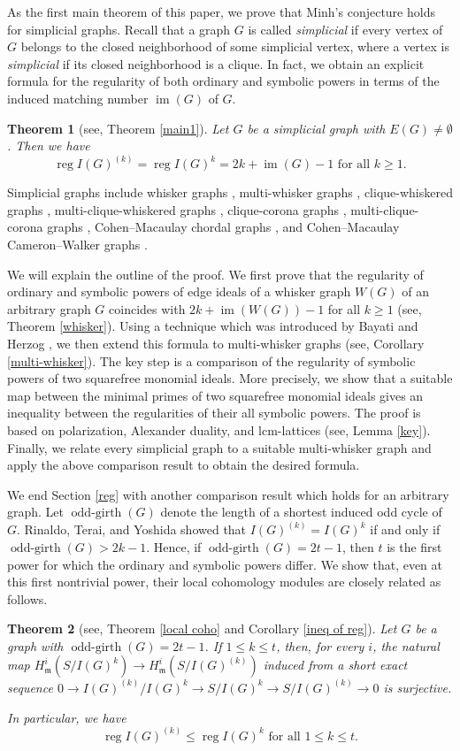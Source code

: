 \documentclass[12pt]{amsart}
\newtheorem{thm}{Theorem}[section]
\theoremstyle{definition}
\theoremstyle{remark}
\DeclareMathOperator{\reg}{reg}
\DeclareMathOperator{\im}{im}
\DeclareMathOperator{\ogirth}{odd-girth}
\begin{document}
As the first main theorem of this paper, we prove that Minh's conjecture holds for simplicial graphs. Recall that a graph $G$ is called {\it simplicial} if every vertex of $G$ belongs to the closed neighborhood of some simplicial vertex, where a vertex is {\it simplicial} if its closed neighborhood is a clique. In fact, we obtain an explicit formula for the regularity of both ordinary and symbolic powers in terms of the induced matching number $\im(G)$ of $G$. 
\begin{thm}[see, Theorem \ref{main1}]
Let $G$ be a simplicial graph with $E(G)\neq\emptyset$. Then we have 
$$\reg I(G)^{(k)}=\reg I(G)^{k}=2k+\im(G)-1\mbox{ for all }k\geq1.$$
\end{thm}
Simplicial graphs include whisker graphs \cite{v1990}, multi-whisker graphs \cite{mpt2025}, clique-whiskered graphs \cite{cn2012}, multi-clique-whiskered graphs \cite{mt2025}, clique-corona graphs \cite{hp2022}, multi-clique-corona graphs \cite{mt2026}, Cohen--Macaulay chordal graphs \cite{hhz2006}, and Cohen--Macaulay Cameron--Walker graphs \cite{hhko2015}.

We will explain the outline of the proof. We first prove that the regularity of ordinary and symbolic powers of edge ideals of a whisker graph $W(G)$ of an arbitrary graph $G$ coincides with $2k+\im(W(G))-1$ for all $k\geq1$ (see, Theorem \ref{whisker}). Using a technique which was introduced by Bayati and Herzog \cite{bh2014}, we then extend this formula to multi-whisker graphs (see, Corollary \ref{multi-whisker}). The key step is a comparison of the regularity of symbolic powers of two squarefree monomial ideals. More precisely, we show that a suitable map between the minimal primes of two squarefree monomial ideals gives an inequality between the regularities of their all symbolic powers. The proof is based on polarization, Alexander duality, and lcm-lattices (see, Lemma \ref{key}). Finally, we relate every simplicial graph to a suitable multi-whisker graph and apply the above comparison result to obtain the desired formula. 

We end Section \ref{reg} with another comparison result which holds for an arbitrary graph. Let $\ogirth(G)$ denote the length of a shortest induced odd cycle of $G$. Rinaldo, Terai, and Yoshida \cite{rty2011} showed that $I(G)^{(k)}=I(G)^{k}$ if and only if $\ogirth(G)>2k-1$. Hence, if $\ogirth(G)=2t-1$, then $t$ is the first power for which the ordinary and symbolic powers differ. We show that, even at this first nontrivial power, their local cohomology modules are closely related as follows. 
\begin{thm}[see, Theorem \ref{local coho} and Corollary \ref{ineq of reg}]
Let $G$ be a graph with $\ogirth(G)=2t-1$. If $1\leq k\leq t$, then, for every $i$, the natural map $H_{\mathfrak{m}}^{i}(S/I(G)^{k})\rightarrow H_{\mathfrak{m}}^{i}(S/I(G)^{(k)})$ induced from a short exact sequence $0\rightarrow I(G)^{(k)}/I(G)^{k}\rightarrow S/I(G)^{k}\rightarrow S/I(G)^{(k)}\rightarrow0$ is surjective. 

In particular, we have $$\reg I(G)^{(k)}\leq\reg I(G)^{k}\mbox{ for all }1\leq k\leq t.$$
\end{thm}
\end{document}
